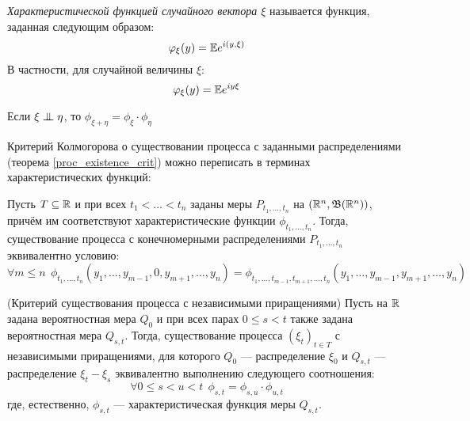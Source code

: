 \begin{reminder}
	\textit{Характеристической функцией случайного вектора $\xi$} называется функция, заданная следующим образом:
	\[
		\varphi_\xi(y) = \mathbb{E} e^{i(y, \xi)}
	\]
	В частности, для случайной величины $\xi$:
	\[
		\varphi_\xi(y) = \mathbb{E} e^{iy\xi}
	\]
\end{reminder}

\begin{reminder}
	Если $\xi \perp\mkern-9.5mu\perp \eta$, то $\phi_{\xi + \eta} = \phi_\xi \cdot \phi_\eta$
\end{reminder}

\begin{note}
	Критерий Колмогорова о существовании процесса с заданными распределениями (теорема \ref{proc_existence_crit}) можно переписать в терминах характеристических функций:
	
	Пусть $T \subseteq \mathbb{R}$ и при всех $t_1 < \ldots < t_n$ заданы меры $P_{t_1, \ldots, t_n}$ на $(\mathbb{R}^n, \mathfrak{B}(\mathbb{R}^n))$, причём им соответствуют характеристические функции $\phi_{t_1, \ldots, t_n}$. Тогда, существование процесса с конечномерными распределениями $P_{t_1, \ldots, t_n}$ эквивалентно условию:
	\[
		\forall m \le n\ \ \phi_{t_1, \ldots, t_n}(y_1, \ldots, y_{m - 1}, 0, y_{m + 1}, \ldots, y_n) = \phi_{t_1, \ldots, t_{m - 1}, t_{m + 1}, \ldots, t_n}(y_1, \ldots, y_{m - 1}, y_{m + 1}, \ldots, y_n)
	\]
\end{note}

\begin{theorem} (Критерий существования процесса с независимыми приращениями)
	Пусть на $\mathbb{R}$ задана вероятностная мера $Q_0$ и при всех парах $0 \le s < t$ также задана вероятностная мера $Q_{s, t}$. Тогда, существование процесса $(\xi_t)_{t \in T}$ с независимыми приращениями, для которого $Q_0$ --- распределение $\xi_0$ и $Q_{s, t}$ --- распределение $\xi_t - \xi_s$ эквивалентно выполнению следующего соотношения:
	\[
		\forall 0 \le s < u < t\ \ \phi_{s, t} = \phi_{s, u} \cdot \phi_{u, t}
	\]
	где, естественно, $\phi_{s, t}$ --- характеристическая функция меры $Q_{s, t}$.
\end{theorem}

